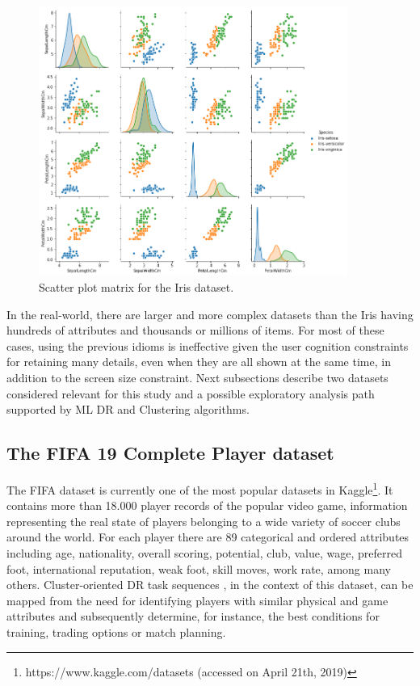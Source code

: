 \begin{figure}[ht]
 \centering
 \includegraphics[width=0.9\textwidth]{iris-scatterplot.png}
 \caption{Scatter plot matrix for the Iris dataset.}
 \label{fig:iris-scatterplot}
\end{figure}

In the real-world, there are larger and more complex datasets than the Iris having hundreds of attributes and thousands or millions of items. For most of these cases, using the previous idioms is ineffective given the user cognition constraints for retaining many details, even when they are all shown at the same time, in addition to the screen size constraint. Next subsections describe two datasets considered relevant for this study and a possible exploratory analysis path supported by ML DR and Clustering algorithms.

\subsection{The FIFA 19 Complete Player dataset} %
\label{subsection1.1.1}

The FIFA dataset is currently one of the most popular datasets in Kaggle\footnote{https://www.kaggle.com/datasets (accessed on April 21th, 2019)}. It contains more than 18.000 player records of the popular video game, information representing the real state of players belonging to a wide variety of soccer clubs around the world. For each player there are 89 categorical and ordered attributes including age, nationality, overall scoring, potential, club, value, wage, preferred foot, international reputation, weak foot, skill moves, work rate, among many others. Cluster-oriented DR task sequences \cite{Brehmer2014VisualizingSequences}, in the context of this dataset, can be mapped from the need for identifying players with similar physical and game attributes and subsequently determine, for instance, the best conditions for training, trading options or match planning.

